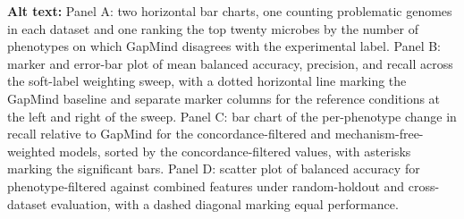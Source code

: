 \noindent\textbf{Alt text:} Panel A: two horizontal bar charts, one counting problematic genomes in each dataset and one ranking the top twenty microbes by the number of phenotypes on which GapMind disagrees with the experimental label. Panel B: marker and error-bar plot of mean balanced accuracy, precision, and recall across the soft-label weighting sweep, with a dotted horizontal line marking the GapMind baseline and separate marker columns for the reference conditions at the left and right of the sweep. Panel C: bar chart of the per-phenotype change in recall relative to GapMind for the concordance-filtered and mechanism-free-weighted models, sorted by the concordance-filtered values, with asterisks marking the significant bars. Panel D: scatter plot of balanced accuracy for phenotype-filtered against combined features under random-holdout and cross-dataset evaluation, with a dashed diagonal marking equal performance.
\par\medskip


